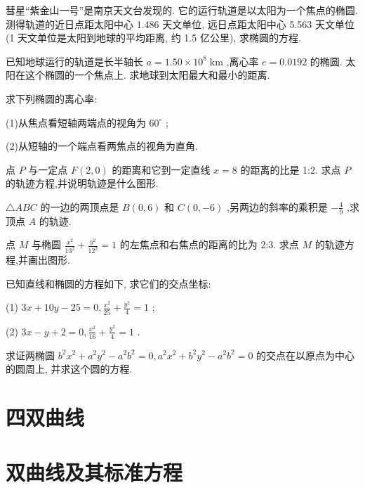 \documentclass[lang=cn,newtx,10pt,scheme=chinese]{elegantbook}
\begin{document}
\begin{problemset}[习 题 六]
\item 彗星“紫金山一号”是南京天文台发现的. 它的运行轨道是以太阳为一个焦点的椭圆. 测得轨道的近日点距太阳中心 1.486 天文单位, 远日点距太阳中心 5.563 天文单位 (1 天文单位是太阳到地球的平均距离, 约 1.5 亿公里), 求椭圆的方程.

\item 已知地球运行的轨道是长半轴长 \(a = {1.50} \times {10}^{8}\mathrm{\;{km}}\) ,离心率 \(e = {0.0192}\) 的椭圆. 太阳在这个椭圆的一个焦点上. 求地球到太阳最大和最小的距离.

\item 求下列椭圆的离心率:

(1)从焦点看短轴两端点的视角为 \({60}^{ \circ }\) ;

(2)从短轴的一个端点看两焦点的视角为直角.

\item 点 \(P\) 与一定点 \(F\left( {2,0}\right)\) 的距离和它到一定直线 \(x = 8\) 的距离的比是 1:2. 求点 \(P\) 的轨迹方程,并说明轨迹是什么图形.

\item \(\bigtriangleup {ABC}\) 的一边的两顶点是 \(B\left( {0,6}\right)\) 和 \(C\left( {0, - 6}\right)\) ,另两边的斜率的乘积是 \(- \frac{4}{9}\) ,求顶点 \(A\) 的轨迹.

\item 点 \(M\) 与椭圆 \(\frac{{x}^{2}}{{13}^{2}} + \frac{{y}^{2}}{{12}^{2}} = 1\) 的左焦点和右焦点的距离的比为 2:3. 求点 \(M\) 的轨迹方程,并画出图形.

\item 已知直线和椭圆的方程如下, 求它们的交点坐标:

(1) \({3x} + {10y} - {25} = 0,\frac{{x}^{2}}{25} + \frac{{y}^{2}}{4} = 1\) ;

(2) \({3x} - y + 2 = 0,\frac{{x}^{2}}{16} + \frac{{y}^{2}}{4} = 1\) .

\item 求证两椭圆 \({b}^{2}{x}^{2} + {a}^{2}{y}^{2} - {a}^{2}{b}^{2} = 0,{a}^{2}{x}^{2} + {b}^{2}{y}^{2} - {a}^{2}{b}^{2} = 0\) 的交点在以原点为中心的圆周上, 并求这个圆的方程.

\end{problemset}

\section*{四\text{ }双曲线}

\section{双曲线及其标准方程}
\end{document}
